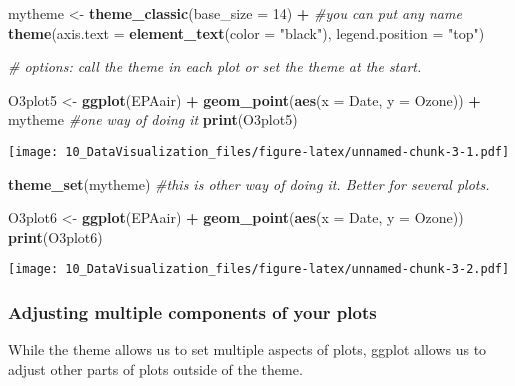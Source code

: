 \documentclass[]{article}
\newenvironment{Shaded}{\begin{snugshade}}{\end{snugshade}}
\newcommand{\KeywordTok}[1]{\textcolor[rgb]{0.13,0.29,0.53}{\textbf{#1}}}
\newcommand{\DataTypeTok}[1]{\textcolor[rgb]{0.13,0.29,0.53}{#1}}
\newcommand{\DecValTok}[1]{\textcolor[rgb]{0.00,0.00,0.81}{#1}}
\newcommand{\StringTok}[1]{\textcolor[rgb]{0.31,0.60,0.02}{#1}}
\newcommand{\CommentTok}[1]{\textcolor[rgb]{0.56,0.35,0.01}{\textit{#1}}}
\newcommand{\OperatorTok}[1]{\textcolor[rgb]{0.81,0.36,0.00}{\textbf{#1}}}
\newcommand{\NormalTok}[1]{#1}
\begin{document}
\begin{Shaded}
\begin{Highlighting}[]
\NormalTok{mytheme <-}\StringTok{ }\KeywordTok{theme_classic}\NormalTok{(}\DataTypeTok{base_size =} \DecValTok{14}\NormalTok{) }\OperatorTok{+}\StringTok{ }\CommentTok{#you can put any name}
\StringTok{  }\KeywordTok{theme}\NormalTok{(}\DataTypeTok{axis.text =} \KeywordTok{element_text}\NormalTok{(}\DataTypeTok{color =} \StringTok{"black"}\NormalTok{), }
        \DataTypeTok{legend.position =} \StringTok{"top"}\NormalTok{) }

\CommentTok{# options: call the theme in each plot or set the theme at the start. }

\NormalTok{O3plot5 <-}\StringTok{ }\KeywordTok{ggplot}\NormalTok{(EPAair) }\OperatorTok{+}
\StringTok{  }\KeywordTok{geom_point}\NormalTok{(}\KeywordTok{aes}\NormalTok{(}\DataTypeTok{x =}\NormalTok{ Date, }\DataTypeTok{y =}\NormalTok{ Ozone)) }\OperatorTok{+}
\StringTok{  }\NormalTok{mytheme }\CommentTok{#one way of doing it}
\KeywordTok{print}\NormalTok{(O3plot5)  }
\end{Highlighting}
\end{Shaded}

\texttt{[image: 10\_DataVisualization\_files/figure-latex/unnamed-chunk-3-1.pdf]}

\begin{Shaded}
\begin{Highlighting}[]
\KeywordTok{theme_set}\NormalTok{(mytheme) }\CommentTok{#this is other way of doing it. Better for several plots.}

\NormalTok{O3plot6 <-}\StringTok{ }\KeywordTok{ggplot}\NormalTok{(EPAair) }\OperatorTok{+}
\StringTok{  }\KeywordTok{geom_point}\NormalTok{(}\KeywordTok{aes}\NormalTok{(}\DataTypeTok{x =}\NormalTok{ Date, }\DataTypeTok{y =}\NormalTok{ Ozone))}
\KeywordTok{print}\NormalTok{(O3plot6)  }
\end{Highlighting}
\end{Shaded}

\texttt{[image: 10\_DataVisualization\_files/figure-latex/unnamed-chunk-3-2.pdf]}

\subsubsection{Adjusting multiple components of your
plots}\label{adjusting-multiple-components-of-your-plots}

While the theme allows us to set multiple aspects of plots, ggplot
allows us to adjust other parts of plots outside of the theme.
\end{document}
